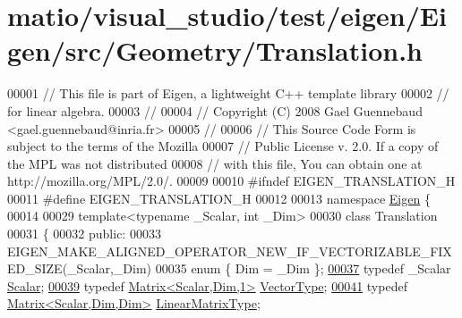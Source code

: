 \hypertarget{matio_2visual__studio_2test_2eigen_2_eigen_2src_2_geometry_2_translation_8h_source}{}\section{matio/visual\+\_\+studio/test/eigen/\+Eigen/src/\+Geometry/\+Translation.h}
\label{matio_2visual__studio_2test_2eigen_2_eigen_2src_2_geometry_2_translation_8h_source}

\begin{DoxyCode}
00001 \textcolor{comment}{// This file is part of Eigen, a lightweight C++ template library}
00002 \textcolor{comment}{// for linear algebra.}
00003 \textcolor{comment}{//}
00004 \textcolor{comment}{// Copyright (C) 2008 Gael Guennebaud <gael.guennebaud@inria.fr>}
00005 \textcolor{comment}{//}
00006 \textcolor{comment}{// This Source Code Form is subject to the terms of the Mozilla}
00007 \textcolor{comment}{// Public License v. 2.0. If a copy of the MPL was not distributed}
00008 \textcolor{comment}{// with this file, You can obtain one at http://mozilla.org/MPL/2.0/.}
00009 
00010 \textcolor{preprocessor}{#ifndef EIGEN\_TRANSLATION\_H}
00011 \textcolor{preprocessor}{#define EIGEN\_TRANSLATION\_H}
00012 
00013 \textcolor{keyword}{namespace }\hyperlink{namespace_eigen}{Eigen} \{ 
00014 
00029 \textcolor{keyword}{template}<\textcolor{keyword}{typename} \_Scalar, \textcolor{keywordtype}{int} \_Dim>
00030 \textcolor{keyword}{class }Translation
00031 \{
00032 \textcolor{keyword}{public}:
00033   EIGEN\_MAKE\_ALIGNED\_OPERATOR\_NEW\_IF\_VECTORIZABLE\_FIXED\_SIZE(\_Scalar,\_Dim)
00035   \textcolor{keyword}{enum} \{ Dim = \_Dim \};
\hyperlink{group___geometry___module_ad596bf21ced4b902cc242205df486e21}{00037}   \textcolor{keyword}{typedef} \_Scalar \hyperlink{group___geometry___module_ad596bf21ced4b902cc242205df486e21}{Scalar};
\hyperlink{group___geometry___module_a339e17dfec5394ae563f62cca0df451f}{00039}   \textcolor{keyword}{typedef} \hyperlink{group___core___module}{Matrix<Scalar,Dim,1>} \hyperlink{group___geometry___module_a339e17dfec5394ae563f62cca0df451f}{VectorType};
\hyperlink{group___geometry___module_ac5aca3bc67564e96ad550aba971de8b6}{00041}   \textcolor{keyword}{typedef} \hyperlink{group___core___module_class_eigen_1_1_matrix}{Matrix<Scalar,Dim,Dim>} \hyperlink{group___geometry___module_ac5aca3bc67564e96ad550aba971de8b6}{LinearMatrixType};

\end{DoxyCode}
